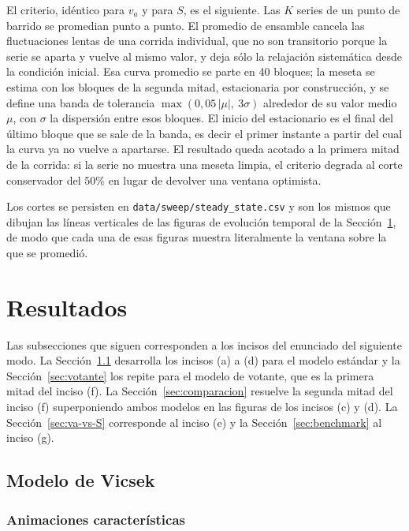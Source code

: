 \documentclass[11pt]{article}
\begin{document}
El criterio, idéntico para $v_a$ y para $S$, es el siguiente. Las $K$ series de
un punto de barrido se promedian punto a punto. El promedio de ensamble cancela
las fluctuaciones lentas de una corrida individual, que no son transitorio
porque la serie se aparta y vuelve al mismo valor, y deja sólo la relajación
sistemática desde la condición inicial. Esa curva promedio se parte en 40
bloques; la meseta se estima con los bloques de la segunda mitad, estacionaria
por construcción, y se define una banda de tolerancia
$\max(0{,}05\,|\mu|,\ 3\sigma)$ alrededor de su valor medio $\mu$, con $\sigma$
la dispersión entre esos bloques. El inicio del estacionario es el final del
último bloque que se sale de la banda, es decir el primer instante a partir del
cual la curva ya no vuelve a apartarse. El resultado queda acotado a la primera
mitad de la corrida: si la serie no muestra una meseta limpia, el criterio
degrada al corte conservador del $50\%$ en lugar de devolver una ventana
optimista.

Los cortes se persisten en \texttt{data/sweep/steady\_state.csv} y son los
mismos que dibujan las líneas verticales de las figuras de evolución temporal de
la Sección~\ref{sec:resultados}, de modo que cada una de esas figuras muestra
literalmente la ventana sobre la que se promedió.

\section{Resultados}
\label{sec:resultados}

Las subsecciones que siguen corresponden a los incisos del enunciado del
siguiente modo. La Sección~\ref{sec:vicsek} desarrolla los incisos (a) a (d)
para el modelo estándar y la Sección~\ref{sec:votante} los repite para el
modelo de votante, que es la primera mitad del inciso (f). La
Sección~\ref{sec:comparacion} resuelve la segunda mitad del inciso (f)
superponiendo ambos modelos en las figuras de los incisos (c) y (d). La
Sección~\ref{sec:va-vs-S} corresponde al inciso (e) y la
Sección~\ref{sec:benchmark} al inciso (g).

\subsection{Modelo de Vicsek}
\label{sec:vicsek}

\subsubsection{Animaciones características}
\label{sec:animacion-vicsek}
\end{document}
